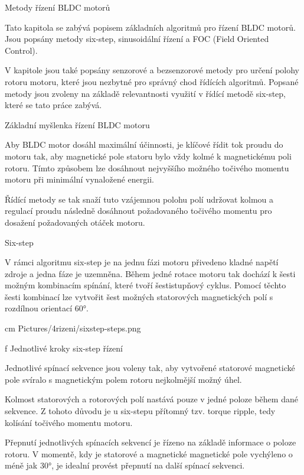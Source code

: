 
\chap Metody řízení BLDC motorů

Tato kapitola se zabývá popisem základních algoritmů pro řízení BLDC motorů. 
Jsou popsány metody six-step, sinusoidální řízení a FOC (Field Oriented Control).

V kapitole jsou také popsány senzorové a bezsenzorové metody pro určení polohy rotoru motoru,
které jsou nezbytné pro správný chod řídících algoritmů. Popsané metody jsou zvoleny na základě
relevantnosti využití v řídící metodě six-step, které se tato práce zabývá.

\sec Základní myšlenka řízení BLDC motoru

    Aby BLDC motor dosáhl maximální účinnosti, je klíčové řídit tok proudu do motoru tak, aby magnetické pole statoru bylo vždy
    kolmé k magnetickému poli rotoru. Tímto způsobem lze dosáhnout nejvyššího možného točivého momentu motoru při minimální
    vynaložené energii. 

    Řídící metody se tak snaží tuto vzájemnou polohu polí udržovat kolmou a regulací proudu následně dosáhnout požadovaného točivého momentu
    pro dosažení požadovaných otáček motoru.

\sec Six-step 

    V rámci algoritmu six-step je na jednu fázi motoru přivedeno kladné napětí zdroje a jedna fáze je uzemněna.
    Během jedné rotace motoru tak dochází k šesti možným kombinacím spínání, které tvoří šestistupňový cyklus.
    Pomocí těchto šesti kombinací lze vytvořit šest možných statorových magnetických polí s rozdílnou orientací 60°.

    \medskip
     cm \cinspic Pictures/4rizeni/sixstep-steps.png 
    \caption/f Jednotlivé kroky six-step řízení
    \medskip

    Jednotlivé spínací sekvence jsou voleny tak, aby 
    vytvořené statorové magnetické pole svíralo s magnetickým polem rotoru nejkolmější možný úhel.

    Kolmost statorových a rotorových polí nastává pouze v jedné poloze během dané sekvence.
    Z tohoto důvodu je u six-stepu přítomný tzv. torque ripple, tedy kolísání točivého momentu motoru.

    Přepnutí jednotlivých spínacích sekvencí je řízeno na základě informace o poloze rotoru.
    V momentě, kdy je statorové a magnetické magnetické pole vychýleno o méně jak 30°, je idealní
     provést přepnutí na další spínací sekvenci. 

